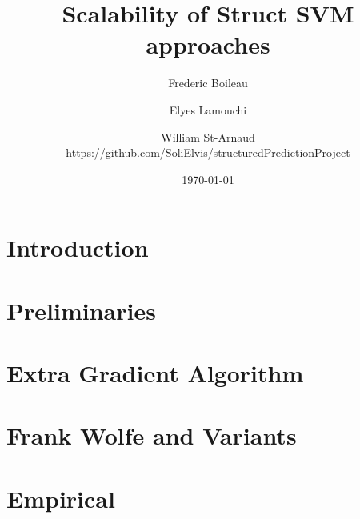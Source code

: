 


\usepackage{graphicx} %
\graphicspath{{figures/}} %
\usepackage[
  backend=biber,
  citestyle=authoryear-ibid,
  natbib=true
  ]{biblatex}
\usepackage{csquotes}
\usepackage{comment}

\usepackage{fancyhdr}
\pagestyle{fancyplain}
\fancyhf{}
\rhead{ \fancyplain{}{\today} }
\rfoot{ \fancyplain{}{\thepage} }
\renewcommand\nameyeardelim{, }

\usepackage[toc,page]{appendix}



\title{Scalability of Struct SVM approaches}
\date{\today}
\author{Frederic Boileau \and Elyes Lamouchi \and William St-Arnaud \\
\url{https://github.com/SoliElvis/structuredPredictionProject}}

\maketitle
{}
\clearpage
\tableofcontents
\clearpage
\section{Introduction}


\clearpage
\section{Preliminaries}

% 

\clearpage
\section{Extra Gradient Algorithm}

\clearpage
\section{Frank Wolfe and Variants}


\clearpage
\section{Empirical}

% 

